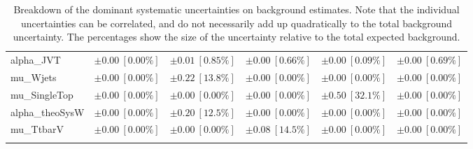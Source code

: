 \begin{sidewaystable}
\begin{center}
\begin{tabular*}{\textwidth}{@{\extracolsep{\fill}}lccccc}
alpha\_JVT         & $\pm 0.00\ [0.00\%] $          & $\pm 0.01\ [0.85\%] $          & $\pm 0.00\ [0.66\%] $          & $\pm 0.00\ [0.09\%] $          & $\pm 0.00\ [0.69\%] $       \\
mu\_Wjets         & $\pm 0.00\ [0.00\%] $          & $\pm 0.22\ [13.8\%] $          & $\pm 0.00\ [0.00\%] $          & $\pm 0.00\ [0.00\%] $          & $\pm 0.00\ [0.00\%] $       \\
mu\_SingleTop         & $\pm 0.00\ [0.00\%] $          & $\pm 0.00\ [0.00\%] $          & $\pm 0.00\ [0.00\%] $          & $\pm 0.50\ [32.1\%] $          & $\pm 0.00\ [0.00\%] $       \\
alpha\_theoSysW         & $\pm 0.00\ [0.00\%] $          & $\pm 0.20\ [12.5\%] $          & $\pm 0.00\ [0.00\%] $          & $\pm 0.00\ [0.00\%] $          & $\pm 0.00\ [0.00\%] $       \\
mu\_TtbarV         & $\pm 0.00\ [0.00\%] $          & $\pm 0.00\ [0.00\%] $          & $\pm 0.08\ [14.5\%] $          & $\pm 0.00\ [0.00\%] $          & $\pm 0.00\ [0.00\%] $       \\
\noalign{\smallskip}\hline\noalign{\smallskip}
\end{tabular*}
\end{center}
\caption[Breakdown of uncertainty on background estimates]{
Breakdown of the dominant systematic uncertainties on background estimates.
Note that the individual uncertainties can be correlated, and do not necessarily add up quadratically to 
the total background uncertainty. The percentages show the size of the uncertainty relative to the total expected background.
\label{table.results.bkgestimate.uncertainties.SRC2_bybkg}}
\end{sidewaystable}
%
